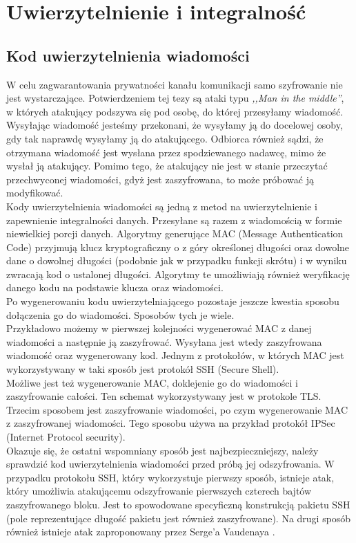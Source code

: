\section{Uwierzytelnienie i integralność}

\subsection{Kod uwierzytelnienia wiadomości}
W celu zagwarantowania prywatności kanału komunikacji samo szyfrowanie nie jest wystarczające. 
Potwierdzeniem tej tezy są ataki typu \textit{,,Man in the middle''}, w których atakujący podszywa się 
pod osobę, do której przesyłamy wiadomość. Wysyłając wiadomość jesteśmy przekonani, że wysyłamy ją do docelowej osoby,
gdy tak naprawdę wysyłamy ją do atakującego. Odbiorca również sądzi, że otrzymana wiadomość jest wysłana 
przez spodziewanego nadawcę, mimo że wysłał ją atakujący. Pomimo tego, że atakujący nie jest w stanie przeczytać
przechwyconej wiadomości, gdyż jest zaszyfrowana, to może próbować ją modyfikować. \\
Kody uwierzytelnienia wiadomości są jedną z metod na uwierzytelnienie i zapewnienie 
integralności danych. Przesyłane są razem z wiadomością w formie niewielkiej porcji danych.
Algorytmy generujące MAC (Message Authentication Code) przyjmują klucz kryptograficzny o z góry określonej długości oraz dowolne dane 
o dowolnej długości (podobnie jak w przypadku funkcji skrótu) i w wyniku zwracają kod o ustalonej długości.
Algorytmy te umożliwiają również weryfikację danego kodu na podstawie klucza oraz wiadomości. \\
Po wygenerowaniu kodu uwierzytelniającego pozostaje jeszcze kwestia sposobu dołączenia go do wiadomości.
Sposobów tych je wiele. \\
Przykładowo możemy w pierwszej kolejności wygenerować MAC z danej wiadomości a następnie ją zaszyfrować. 
Wysyłana jest wtedy zaszyfrowana wiadomość oraz wygenerowany kod. Jednym z protokołów, w których 
MAC jest wykorzystywany w taki sposób jest protokół SSH (Secure Shell). \\
Możliwe jest też wygenerowanie MAC, doklejenie go do wiadomości i zaszyfrowanie całości.
Ten schemat wykorzystywany jest w protokole TLS. \\
Trzecim sposobem jest zaszyfrowanie wiadomości, po czym wygenerowanie MAC z zaszyfrowanej wiadomości.
Tego sposobu używa na przykład protokół IPSec (Internet Protocol security). \\
Okazuje się, że ostatni wspomniany sposób jest najbezpieczniejszy, należy sprawdzić kod uwierzytelnienia wiadomości
przed próbą jej odszyfrowania. W przypadku protokołu SSH, który wykorzystuje pierwszy sposób, istnieje atak, 
który umożliwia atakującemu odszyfrowanie pierwszych czterech bajtów zaszyfrowanego bloku. Jest to spowodowane 
specyficzną konstrukcją pakietu SSH (pole reprezentujące długość pakietu jest również zaszyfrowane).
Na drugi sposób również istnieje atak zaproponowany przez Serge'a Vaudenaya \cite{tls}.

